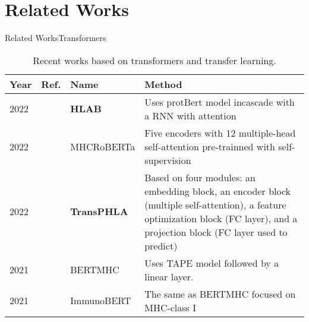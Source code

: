 \documentclass[10pt]{beamer}
\newcommand{\1}{
	\setbeamertemplate{background}{
		\texttt{[image: img/1]}
		\tikz[overlay] \fill[fill opacity=0.75,fill=white] (0,0) rectangle (-\paperwidth,\paperheight);
	}
}
\begin{document}
\section{Related Works}


\begin{frame}{Related Works}{Transformers}
	
	\fontsize{8pt}{5pt}\selectfont
	
	\begin{table}[]
		\centering
		\caption{Recent works based on transformers and transfer learning.}		
		\setlength{\tabcolsep}{0.5em} %
		{\renewcommand{\arraystretch}{2}%
			\begin{tabular}{p{0.6cm}p{0.6cm}p{2cm}p{5cm}}
				\textbf{Year} & \textbf{Ref.}                                  & \textbf{Name} & \textbf{Method}                                                                                                                                                                                                         \\ \hline
				2022 		  & \cite{zhang2022hlab} 		  &		\textbf{HLAB} 			 	   & Uses protBert model incascade with a RNN with attention  \\
				2022          & \cite{wang2022mhcroberta}     &     MHCRoBERTa           & Five encoders with 12 multiple-head self-attention pre-trainned with self-supervision             \\
				2022          & \cite{chu2022transformer}     &     \textbf{TransPHLA}             & Based on four modules: an embedding block, an encoder block (multiple self-attention), a feature optimization block (FC layer), and a projection block (FC layer used to predict)          \\
				2021          & \cite{cheng2021bertmhc}       &     BERTMHC             & Uses TAPE model followed by a linear layer.                          \\
				2021          & \cite{gasser2021interpreting} &     ImmunoBERT    	        & The same as BERTMHC focused on MHC-class I  \\
				
				           
			\end{tabular}
		}
	\end{table}	
\end{frame}
\end{document}
